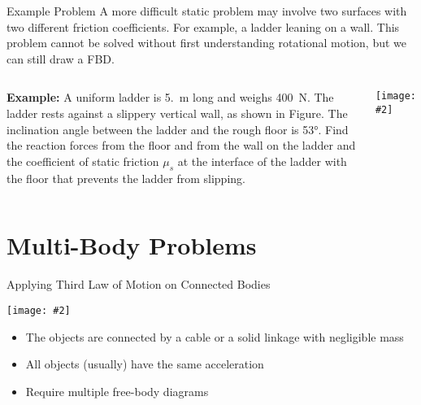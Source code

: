 \documentclass[12pt,compress,aspectratio=169]{beamer}
\newcommand{\pic}[2]{\texttt{[image: \#2]}}
\begin{document}
\begin{frame}{Example Problem}
  A more difficult static problem may involve two surfaces with two different
  friction coefficients. For example, a ladder leaning on a wall. This problem
  cannot be solved without first understanding rotational motion, but we can
  still draw a FBD.
  \vspace{.2in}
  \begin{columns}
    \textbf{Example:} A uniform ladder is \SI{5.}{\metre} long and weighs
    \SI{400}{\newton}. The ladder rests against a slippery vertical wall, as
    shown in Figure. The inclination angle between the ladder and the rough
    floor is \ang{53}. Find the reaction forces from the floor and
    from the wall on the ladder and the coefficient of static friction $\mu_s$
    at the interface of the ladder with the floor that prevents the ladder from
    slipping.

    \pic{1}{graphics/ladder.png}
  \end{columns}
\end{frame}



\section{Multi-Body Problems}

\begin{frame}{Applying Third Law of Motion on Connected Bodies}
  \begin{center}
    \pic{.7}{graphics/worldslongestroadtrainwithpowertrailer8.jpg}
  \end{center}
  \begin{itemize}
  \item The objects are connected by a cable or a solid linkage with negligible
    mass
  \item All objects (usually) have the same acceleration
  \item Require multiple free-body diagrams
  \end{itemize}
\end{frame}
\end{document}
